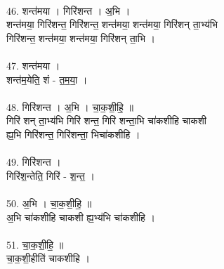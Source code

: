 \\
46. शन्त॑मया । गिरि॑शन्त । अ॒भि ।\\
शन्त॑मया॒ गिरि॑शन्त॒ गिरि॑शन्त॒ शन्त॑मया॒ शन्त॑मया॒ गिरि॑शन् ता॒भ्य॑भि\\
गिरि॑शन्त॒ शन्त॑मया॒ शन्त॑मया॒ गिरि॑शन् ता॒भि ।\\
\\
47. शन्त॑मया ।\\
शन्त॑म॒येति॒ शं - त॒म॒या॒ ।\\
\\
48. गिरि॑शन्त । अ॒भि । चा॒क॒शी॒हि॒ ॥\\
गिरि॑ शन् ता॒भ्य॑भि गिरि॑ शन्त॒ गिरि॑ शन्ता॒भि चा॑कशीहि चाकशी\\
ह्य॒भि गिरि॑शन्त॒ गिरि॑शन्ता॒ भिचा॑कशीहि ।\\
\\
49. गिरि॑शन्त ।\\
गिरि॑श॒न्तेति॒ गिरि॑ - श॒न्त॒ ।\\
\\
50. अ॒भि । चा॒क॒शी॒हि॒ ॥\\
अ॒भि चा॑कशीहि चाकशी ह्य॒भ्य॑भि चा॑कशीहि ।\\
\\
51. चा॒क॒शी॒हि॒ ॥\\
चा॒क॒शी॒हीति॑ चाकशीहि ।\\
\\
